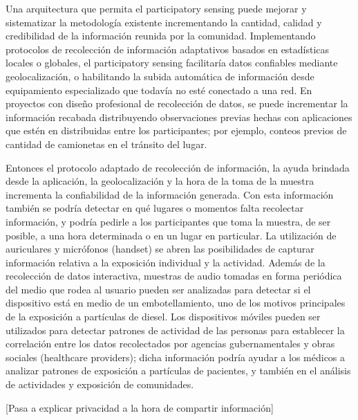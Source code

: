 	Una arquitectura que permita el participatory sensing puede mejorar y sistematizar la metodología existente incrementando la cantidad, calidad y credibilidad de la información reunida por la comunidad. Implementando protocolos de recolección de información adaptativos basados en estadísticas locales o globales, el participatory sensing facilitaría datos confiables mediante geolocalización, o habilitando la subida automática de información desde equipamiento especializado que todavía no esté conectado a una red. En proyectos con diseño profesional de recolección de datos, se puede incrementar la información recabada distribuyendo observaciones previas hechas con aplicaciones que estén en distribuidas entre los participantes; por ejemplo, conteos previos de cantidad de camionetas en el tránsito del lugar.
	
	Entonces el protocolo adaptado de recolección de información, la ayuda brindada desde la aplicación, la geolocalización y la hora de la toma de la muestra incrementa la confiabilidad de la información generada. Con esta información también se podría detectar en qué lugares o momentos falta recolectar información, y podría pedirle a los participantes que toma la muestra, de ser posible, a una hora determinada o en un lugar en particular. La utilización de auriculares y micrófonos (handset) se abren las posibilidades de capturar información relativa a la exposición individual y la actividad. Además de la recolección de datos interactiva, muestras de audio tomadas en forma periódica del medio que rodea al usuario pueden ser analizadas para detectar si el dispositivo está en medio de un embotellamiento, uno de los motivos principales de la exposición a partículas de diesel. Los dispositivos móviles pueden ser utilizados para detectar patrones de actividad de las personas para establecer la correlación entre los datos recolectados por agencias gubernamentales y obras sociales (healthcare providers); dicha información podría ayudar a los médicos a analizar patrones de exposición a partículas de pacientes, y también en el análisis de actividades y exposición de comunidades. \cite{burke2006participatory}
	
	
	[Pasa a explicar privacidad a la hora de compartir información]